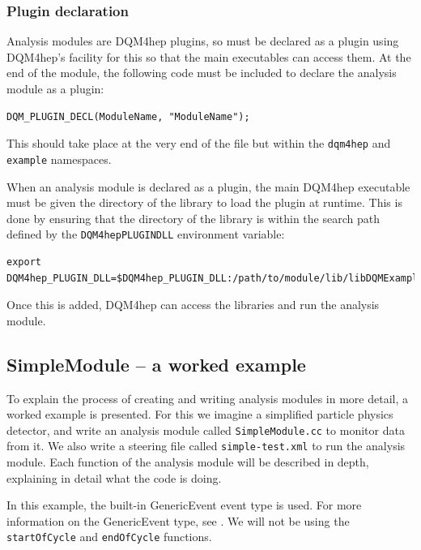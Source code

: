 \subsubsection{Plugin declaration}
Analysis modules are \acrshort{DQM4hep} plugins, so must be declared as a plugin using \acrshort{DQM4hep}'s facility for this so that the main executables can access them. At the end of the module, the following code must be included to declare the analysis module as a plugin:

\begin{lstlisting}
DQM_PLUGIN_DECL(ModuleName, "ModuleName");
\end{lstlisting}

This should take place at the very end of the file but within the \texttt{dqm4hep} and \texttt{example} namespaces.

When an analysis module is declared as a plugin, the main \acrshort{DQM4hep} executable must be given the directory of the library to load the plugin at runtime. This is done by ensuring that the directory of the library is within the search path defined by the \texttt{DQM4hep\textunderscore PLUGIN\textunderscore DLL} environment variable:

\begin{lstlisting}
export DQM4hep_PLUGIN_DLL=$DQM4hep_PLUGIN_DLL:/path/to/module/lib/libDQMExample.so
\end{lstlisting}

Once this is added, \acrshort{DQM4hep} can access the libraries and run the analysis module.

\subsection{SimpleModule – a worked example} 
To explain the process of creating and writing analysis modules in more detail, a worked example is presented. For this we imagine a simplified particle physics detector, and write an analysis module called \texttt{SimpleModule.cc} to monitor data from it. We also write a steering file called \texttt{simple-test.xml} to run the analysis module. Each function of the analysis module will be described in depth, explaining in detail what the code is doing. 

In this example, the built-in GenericEvent event type is used. For more information on the GenericEvent type, see \cite{dqm4hep-user-manual-genericevent}. We will not be using the \texttt{startOfCycle} and \texttt{endOfCycle} functions.

